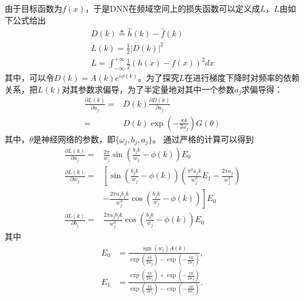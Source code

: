 由于目标函数为$f(x)$，于是DNN在频域空间上的损失函数可以定义成$L$，$L$由如下公式给出
\begin{equation}
\begin{array}{l}  
  D(k)\triangleq\hat{h}(k)-\hat{f}(k)  \\  
  L(k)=\frac{1}{2}\left|D(k)\right|^{2}  \\  
  L=\int_{-\infty}^{+\infty}\frac{1}{2}(h(x)-f(x))^{2}dx
\end{array} 
\end{equation}
其中，可以令$D(k)=A(k)e^{i\phi (k)}$。为了探究$L$在进行梯度下降时对频率的依赖关系，把$L(k)$对其参数求偏导，为了半定量地对其中一个参数$a_j$求偏导得：
\begin{equation}
    \begin{aligned}
\frac{\partial L(k)}{\partial a_{j}}= & D(k)\frac{\partial D(k)}{\partial a_j} \\
=& D(k)\exp(-\frac{\pi k}{2\omega_j})G(\theta)\label{cucao}
\end{aligned}
\end{equation}
其中，$\theta$是神经网络的参数，即$\{\omega_j,b_j,a_j\}$。
通过严格的计算可以得到
\begin{equation}
    \begin{aligned}
\frac{\partial L(k)}{\partial a_{j}}= & \frac{2 \pi}{w_{j}} \sin \left(\frac{b_{j} k}{w_{j}}-\phi(k)\right) E_{0} \\
\frac{\partial L(k)}{\partial w_{j}}= & {\left[\sin \left(\frac{b_{j} k}{w_{j}}-\phi(k)\right)\left(\frac{\pi^{2} a_{j} k}{w_{j}^{3}} E_{1}-\frac{2 \pi a_{j}}{w_{j}^{2}}\right)\right.} \\
& \left.-\frac{2 \pi a_{j} b_{j} k}{w_{j}^{3}} \cos \left(\frac{b_{j} k}{w_{j}}-\phi(k)\right)\right] E_{0} \\
\frac{\partial L(k)}{\partial b_{j}}= & \frac{2 \pi a_{j} b_{j} k}{w_{j}^{2}} \cos \left(\frac{b_{j} k}{w_{j}}-\phi(k)\right) E_{0}
\end{aligned}
\end{equation}
其中
\begin{equation*}
    \begin{aligned}
E_{0} & =\frac{\operatorname{sgn}\left(w_{j}\right) A(k)}{\exp \left(\frac{\pi k}{2 w_{j}}\right)-\exp \left(-\frac{\pi k}{2 w_{j}}\right)}, \\
E_{1} & =\frac{\exp \left(\frac{\pi k}{2 w_{j}}\right)+\exp \left(-\frac{\pi k}{2 w_{j}}\right)}{\exp \left(\frac{\pi k}{2 w_{j}}\right)-\exp \left(-\frac{\pi k}{2 w_{j}}\right)} .
\end{aligned}
\end{equation*}

